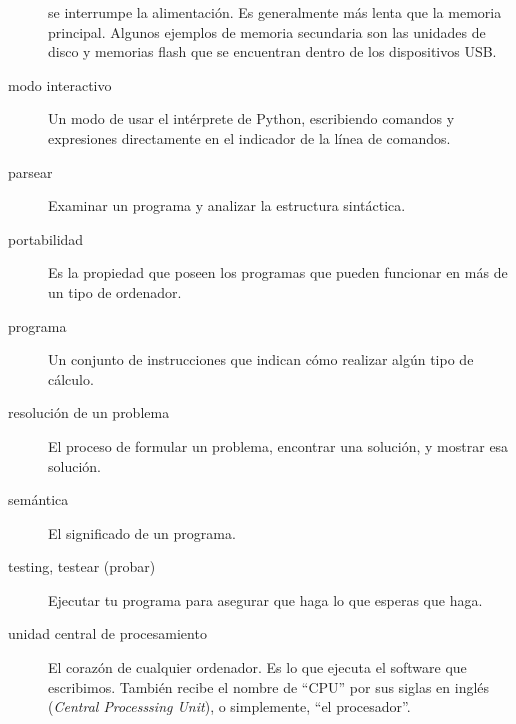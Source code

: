 \begin{description}
se interrumpe la alimentación. Es generalmente más lenta que la memoria
principal. Algunos ejemplos de memoria secundaria son las unidades de
disco y memorias flash que se encuentran dentro de los dispositivos USB.
\item[modo interactivo]
Un modo de usar el intérprete de Python, escribiendo comandos y
expresiones directamente en el indicador de la línea de comandos.
\item[parsear]
Examinar un programa y analizar la estructura sintáctica.
\item[portabilidad]
Es la propiedad que poseen los programas que pueden funcionar en más de
un tipo de ordenador. 
\item[programa]
Un conjunto de instrucciones que indican cómo realizar algún tipo de
cálculo. 
\item[resolución de un problema]
El proceso de formular un problema, encontrar una solución, y mostrar
esa solución. 
\item[semántica]
El significado de un programa. 
\item[testing, testear (probar)]
Ejecutar tu programa para asegurar que haga lo que esperas que haga.
\item[unidad central de procesamiento]
El corazón de cualquier ordenador. Es lo que ejecuta el software que
escribimos. También recibe el nombre de ``CPU'' por sus siglas en inglés
(\emph{Central Processsing Unit}), o simplemente, ``el procesador''.
 
\end{description}


